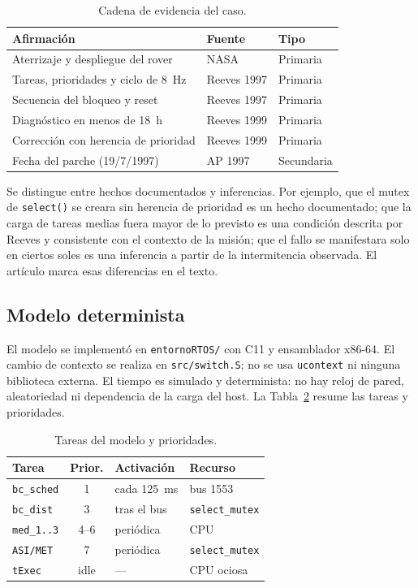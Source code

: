 \documentclass[journal]{IEEEtran}
\begin{document}
\begin{table}[t]
\caption{Cadena de evidencia del caso.}
\label{tab:evidencia}
\centering
\footnotesize
\begin{tabular}{p{3.1cm}p{2.6cm}p{1.4cm}}
\toprule
\textbf{Afirmación} & \textbf{Fuente} & \textbf{Tipo} \\
\midrule
Aterrizaje y despliegue del rover & NASA \cite{nasa2017pathfinder} & Primaria \\
Tareas, prioridades y ciclo de 8~Hz & Reeves 1997 \cite{reeves1997mars} & Primaria \\
Secuencia del bloqueo y reset & Reeves 1997 \cite{reeves1997mars} & Primaria \\
Diagnóstico en menos de 18~h & Reeves 1999 \cite{reeves1999priority} & Primaria \\
Corrección con herencia de prioridad & Reeves 1999 \cite{reeves1999priority} & Primaria \\
Fecha del parche (19/7/1997) & AP 1997 \cite{ap1997glitch} & Secundaria \\
\bottomrule
\end{tabular}
\end{table}

Se distingue entre hechos documentados y inferencias. Por ejemplo, que el mutex de \texttt{select()} se creara sin herencia de prioridad es un hecho documentado; que la carga de tareas medias fuera mayor de lo previsto es una condición descrita por Reeves y consistente con el contexto de la misión; que el fallo se manifestara solo en ciertos soles es una inferencia a partir de la intermitencia observada. El artículo marca esas diferencias en el texto.

\subsection{Modelo determinista}

El modelo se implementó en \texttt{entornoRTOS/} con C11 y ensamblador x86-64. El cambio de contexto se realiza en \texttt{src/switch.S}; no se usa \texttt{ucontext} ni ninguna biblioteca externa. El tiempo es simulado y determinista: no hay reloj de pared, aleatoriedad ni dependencia de la carga del host. La Tabla~\ref{tab:tareas} resume las tareas y prioridades.

\begin{table}[t]
\caption{Tareas del modelo y prioridades.}
\label{tab:tareas}
\centering
\footnotesize
\begin{tabular}{p{1.8cm}c p{1.7cm}p{2.2cm}}
\toprule
\textbf{Tarea} & \textbf{Prior.} & \textbf{Activación} & \textbf{Recurso} \\
\midrule
\texttt{bc\_sched} & 1 & cada 125~ms & bus 1553 \\
\texttt{bc\_dist} & 3 & tras el bus & \texttt{select\_mutex} \\
\texttt{med\_1..3} & 4--6 & periódica & CPU \\
\texttt{ASI/MET} & 7 & periódica & \texttt{select\_mutex} \\
\texttt{tExec} & idle & --- & CPU ociosa \\
\bottomrule
\end{tabular}
\end{table}
\end{document}
